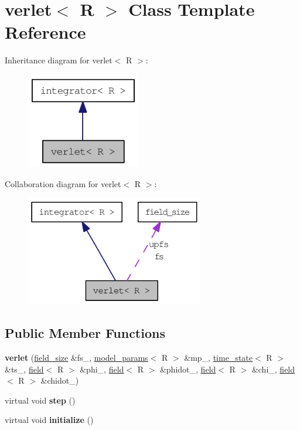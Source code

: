 \hypertarget{classverlet}{
\section{verlet$<$ R $>$ Class Template Reference}
\label{classverlet}
}
Inheritance diagram for verlet$<$ R $>$:\nopagebreak
\begin{figure}[H]
\begin{center}
\leavevmode
\includegraphics[width=140pt]{classverlet__inherit__graph}
\end{center}
\end{figure}
Collaboration diagram for verlet$<$ R $>$:\nopagebreak
\begin{figure}[H]
\begin{center}
\leavevmode
\includegraphics[width=220pt]{classverlet__coll__graph}
\end{center}
\end{figure}
\subsection*{Public Member Functions}
\begin{DoxyCompactItemize}
\item 
\hypertarget{classverlet_a1a51977dc9b12a64728c566c1f7278a5}{
{\bfseries verlet} (\hyperlink{structfield__size}{field\_\-size} \&fs\_\-, \hyperlink{structmodel__params}{model\_\-params}$<$ R $>$ \&mp\_\-, \hyperlink{structtime__state}{time\_\-state}$<$ R $>$ \&ts\_\-, \hyperlink{classfield}{field}$<$ R $>$ \&phi\_\-, \hyperlink{classfield}{field}$<$ R $>$ \&phidot\_\-, \hyperlink{classfield}{field}$<$ R $>$ \&chi\_\-, \hyperlink{classfield}{field}$<$ R $>$ \&chidot\_\-)}
\label{classverlet_a1a51977dc9b12a64728c566c1f7278a5}

\item 
\hypertarget{classverlet_aec84a4b02a724f576a230cf82f5de6c1}{
virtual void {\bfseries step} ()}
\label{classverlet_aec84a4b02a724f576a230cf82f5de6c1}

\item 
\hypertarget{classverlet_a2d3949c36534110a43b25184936282b5}{
virtual void {\bfseries initialize} ()}
\label{classverlet_a2d3949c36534110a43b25184936282b5}

\end{DoxyCompactItemize}
